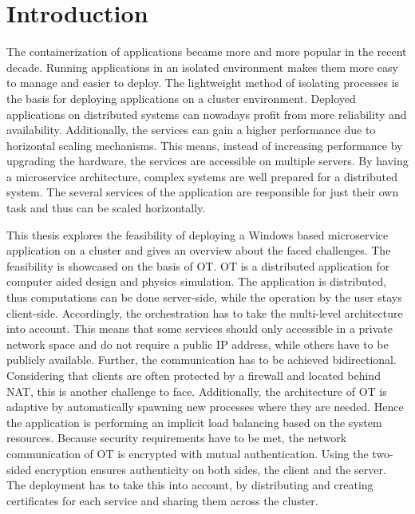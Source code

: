 


\chapter{Introduction} %

\label{chap:introd} %



The containerization of applications became more and more popular in the recent decade. Running applications in an isolated environment makes them more easy to manage and easier to deploy. The lightweight method of isolating processes is the basis for deploying applications on a cluster environment.
Deployed applications on distributed systems can nowadays profit from more reliability and availability. Additionally, the services can gain a higher performance due to horizontal scaling mechanisms. This means, instead of increasing performance by upgrading the hardware, the services are accessible on multiple servers.
By having a microservice architecture, complex systems are well prepared for a distributed system. The several services of the application are responsible for just their own task and thus can be scaled horizontally.

This thesis explores the feasibility of deploying a \ac{Windows} based microservice application on a cluster and gives an overview about the faced challenges. The feasibility is showcased on the basis of \ac{OT}. \ac{OT} is a distributed application for computer aided design and physics simulation. The application is distributed, thus computations can be done server-side, while the operation by the user stays client-side.
Accordingly, the orchestration has to take the multi-level architecture into account. This means that some services should only accessible in a private network space and do not require a public \ac{IP} address, while others have to be publicly available. Further, the communication has to be achieved bidirectional. Considering that clients are often protected by a firewall and located behind \ac{NAT}, this is another challenge to face.
Additionally, the architecture of \ac{OT} is adaptive by automatically spawning new processes where they are needed. Hence the application is performing an implicit load balancing based on the system resources.
Because security requirements have to be met, the network communication of \ac{OT} is encrypted with mutual authentication. Using the two-sided encryption ensures authenticity on both sides, the client and the server. The deployment has to take this into account, by distributing and creating certificates for each service and sharing them across the cluster.

